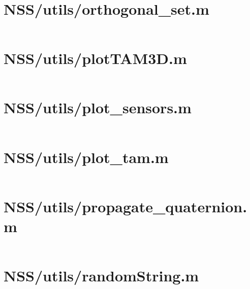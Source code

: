\pagebreak
\section*{NSS/utils/orthogonal\_set.m}\label{code:NSS/utils/orthogonal_set.m}
\inputminted[linenos,fontsize=\scriptsize]{matlab}{/home/dcouture/git/mathyourlife/TSatPy/beta_versions/matlab_object_oriented/utils/orthogonal_set.m}

\pagebreak
\section*{NSS/utils/plotTAM3D.m}\label{code:NSS/utils/plotTAM3D.m}
\inputminted[linenos,fontsize=\scriptsize]{matlab}{/home/dcouture/git/mathyourlife/TSatPy/beta_versions/matlab_object_oriented/utils/plotTAM3D.m}

\pagebreak
\section*{NSS/utils/plot\_sensors.m}\label{code:NSS/utils/plot_sensors.m}
\inputminted[linenos,fontsize=\scriptsize]{matlab}{/home/dcouture/git/mathyourlife/TSatPy/beta_versions/matlab_object_oriented/utils/plot_sensors.m}

\pagebreak
\section*{NSS/utils/plot\_tam.m}\label{code:NSS/utils/plot_tam.m}
\inputminted[linenos,fontsize=\scriptsize]{matlab}{/home/dcouture/git/mathyourlife/TSatPy/beta_versions/matlab_object_oriented/utils/plot_tam.m}

\pagebreak
\section*{NSS/utils/propagate\_quaternion.m}\label{code:NSS/utils/propagate_quaternion.m}
\inputminted[linenos,fontsize=\scriptsize]{matlab}{/home/dcouture/git/mathyourlife/TSatPy/beta_versions/matlab_object_oriented/utils/propagate_quaternion.m}

\pagebreak
\section*{NSS/utils/randomString.m}\label{code:NSS/utils/randomString.m}
\inputminted[linenos,fontsize=\scriptsize]{matlab}{/home/dcouture/git/mathyourlife/TSatPy/beta_versions/matlab_object_oriented/utils/randomString.m}

